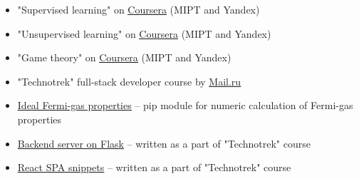 
\begin{itemize}
	\item "Supervised learning" on \href{https://www.coursera.org/learn/supervised-learning?specialization=machine-learning-data-analysis}{\underline{Coursera}} (MIPT and Yandex)
	\item "Unsupervised learning" on \href{https://www.coursera.org/learn/unsupervised-learning?specialization=machine-learning-data-analysis}{\underline{Coursera}} (MIPT and Yandex)
	\item "Game theory" on \href{https://www.coursera.org/learn/gametheory}{\underline{Coursera}} (MIPT and Yandex)
	\item "Technotrek" full-stack developer course by \href{https://track.mail.ru/}{\underline{Mail.ru}}
\end{itemize}


\begin{itemize}
    \item \href{https://github.com/alekseik1/ifg-py}{\underline{Ideal Fermi-gas properties}} -- pip module for numeric calculation of Fermi-gas properties
    \item \href{https://github.com/alekseik1/tt-ridesharing-backend}{Backend server on Flask} -- written as a part of "Technotrek" course
    \item \href{https://github.com/alekseik1/2018-FS-11-Frontend-Kozharin}{React SPA snippets} -- written as a part of "Technotrek" course
\end{itemize}


